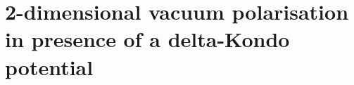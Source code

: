 \chapter{2-dimensional vacuum polarisation in presence of a delta-Kondo potential}\label{chap-vacuum}


